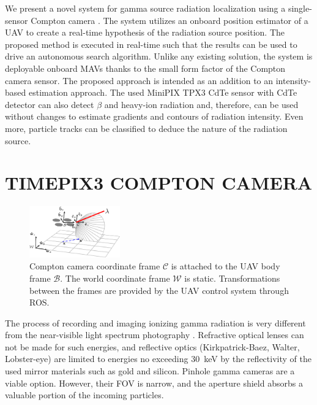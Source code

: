 \documentclass[a4paper,11pt,titlepage,twoside]{book}
\begin{document}
We present a novel system for gamma source radiation localization using a single-sensor Compton camera \cite{turecek2020single}.
The system utilizes an onboard position estimator of a \ac{UAV} to create a real-time hypothesis of the radiation source position.
The proposed method is executed in real-time such that the results can be used to drive an autonomous search algorithm.
Unlike any existing solution, the system is deployable onboard \aclp{MAV} thanks to the small form factor of the Compton camera sensor.
The proposed approach is intended as an addition to an intensity-based estimation approach.
The used MiniPIX TPX3 CdTe sensor with \ac{CdTe} detector can also detect $\beta$ and heavy-ion radiation and, therefore, can be used without changes to estimate gradients and contours of radiation intensity.
Even more, particle tracks can be classified \cite{baca2019timepix} to deduce the nature of the radiation source.




\section{TIMEPIX3 COMPTON CAMERA}


\begin{figure}
  \centering
  \includegraphics[width=0.35\textwidth]{./fig/sketch/coordinate_frames.pdf}
  \caption{
    Compton camera coordinate frame $\mathcal{C}$ is attached to the \ac{UAV} body frame $\mathcal{B}$.
    The world coordinate frame $\mathcal{W}$ is static. Transformations between the frames are provided by the \ac{UAV} control system \cite{baca2020mrs} through \ac{ROS}.
  }
  \label{fig:sketch_coordinate_frames}
\end{figure}


The process of recording and imaging ionizing gamma radiation is very different from the near-visible light spectrum photography \cite{baca2019timepix}.
Refractive optical lenses can not be made for such energies, and reflective optics (Kirkpatrick-Baez, Walter, Lobster-eye) are limited to energies no exceeding \SI{30}{\kilo\electronvolt} by the reflectivity of the used mirror materials such as gold and silicon.
Pinhole gamma cameras are a viable option.
However, their \ac{FOV} is narrow, and the aperture shield absorbs a valuable portion of the incoming particles.
\end{document}
